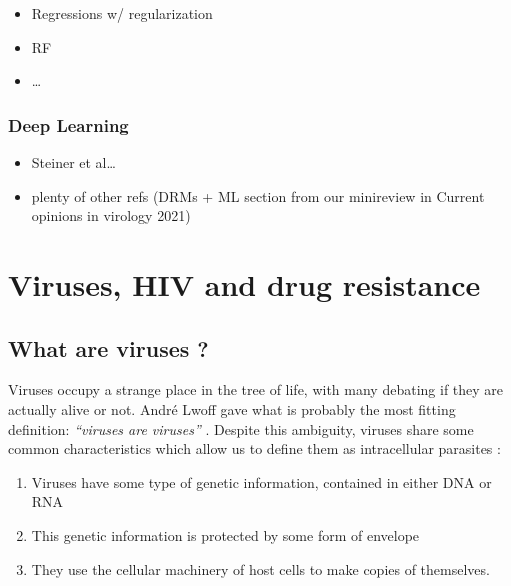 \documentclass[
  11pt,
  twoside]{scrbook}
\providecommand{\tightlist}{%
  \setlength{\itemsep}{0pt}\setlength{\parskip}{0pt}}
\begin{document}
\begin{itemize}
\tightlist
\item
  Regressions w/ regularization
\item
  RF
\item
  \ldots{}
\end{itemize}

\hypertarget{deep-learning}{%
\subsection{Deep Learning}\label{deep-learning}}

\begin{itemize}
\tightlist
\item
  Steiner et al\ldots{}
\item
  plenty of other refs (DRMs + ML section from our minireview in Current opinions in virology 2021)
\end{itemize}

\printbibliography[segment=\therefsegment,heading=subbibintoc,title={References for chapter \thechapter}]

\hypertarget{viruses-hiv-and-drug-resistance}{%
\chapter{Viruses, HIV and drug resistance}\label{viruses-hiv-and-drug-resistance}}

\hypertarget{what-are-viruses}{%
\section{What are viruses ?}\label{what-are-viruses}}

Viruses occupy a strange place in the tree of life, with many debating if they are actually alive or not. André Lwoff gave what is probably the most fitting definition: \emph{``viruses are viruses''} \autocite{lwoffConceptVirus1957}. Despite this ambiguity, viruses share some common characteristics which allow us to define them as intracellular parasites \autocite{minorViruses2014}:

\begin{enumerate}
\def\labelenumi{\arabic{enumi}.}
\tightlist
\item
  Viruses have some type of genetic information, contained in either DNA or RNA
\item
  This genetic information is protected by some form of envelope
\item
  They use the cellular machinery of host cells to make copies of themselves.
\end{enumerate}
\end{document}
